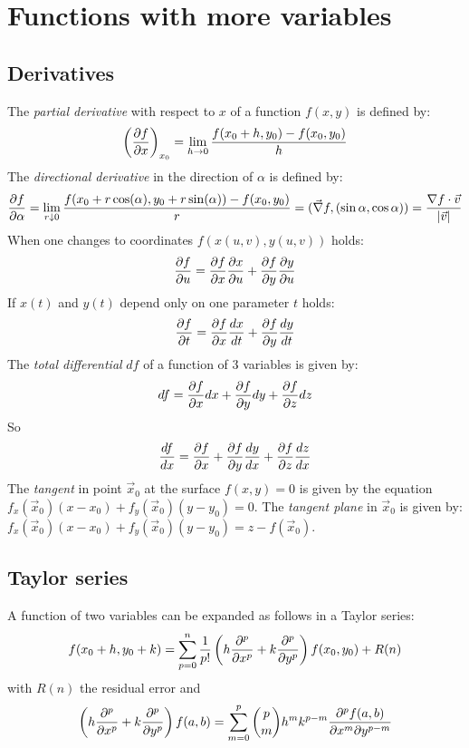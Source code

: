 \documentclass[a4paper,fancyheadings,twoside]{report}
\begin{document}
\section{Functions with more variables}
\subsection{Derivatives}
The {\it partial derivative} with respect to $x$ of a function $f(x,y)$ is defined by:
\[
\left(\frac{\partial f}{\partial x}\right)_{x_0}=\lim_{h\rightarrow0}\frac{f(x_0+h,y_0)-f(x_0,y_0)}{h}
\]
The {\it directional derivative} in the direction of $\alpha$ is defined by:
\[
\frac{\partial f}{\partial \alpha}=\lim_{r\downarrow0}\frac{f(x_0+r\cos(\alpha),y_0+r\sin(\alpha))-f(x_0,y_0)}{r}=
(\vec{\nabla}f,(\sin\alpha,\cos\alpha))=\frac{\nabla f\cdot\vec{v}}{|\vec{v}|}
\]
When one changes to coordinates $f(x(u,v),y(u,v))$ holds:
\[
\frac{\partial f}{\partial u}=\frac{\partial f}{\partial x}\frac{\partial x}{\partial u}+\frac{\partial f}{\partial y}\frac{\partial y}{\partial u}
\]
If $x(t)$ and $y(t)$ depend only on one parameter $t$ holds:
\[
\frac{\partial f}{\partial t}=\frac{\partial f}{\partial x}\frac{dx}{dt}+\frac{\partial f}{\partial y}\frac{dy}{dt}
\]
The {\it total differential} $df$ of a function of 3 variables is given by:
\[
df=\frac{\partial f}{\partial x}dx+\frac{\partial f}{\partial y}dy+\frac{\partial f}{\partial z}dz
\]
So
\[
\frac{df}{dx}=\frac{\partial f}{\partial x}+\frac{\partial f}{\partial y}\frac{dy}{dx}+\frac{\partial f}{\partial z}\frac{dz}{dx}
\]
The {\it tangent} in point $\vec{x}_0$ at the surface $f(x,y)=0$ is given by
the equation $f_x(\vec{x}_0)(x-x_0)+f_y(\vec{x}_0)(y-y_0)=0$.
\npar
The {\it tangent plane} in $\vec{x}_0$ is given by:
$f_x(\vec{x}_0)(x-x_0)+f_y(\vec{x}_0)(y-y_0)=z-f(\vec{x}_0)$.

\subsection{Taylor series}
A function of two variables can be expanded as follows in a Taylor series:
\[
f(x_0+h,y_0+k)=\sum\limits_{p=0}^n \frac{1}{p!}
\left(h\frac{\partial ^p}{\partial x^p}+k\frac{\partial ^p}{\partial y^p}\right)f(x_0,y_0)+R(n)
\]
with $R(n)$ the residual error and
\[
\left(h\frac{\partial ^p}{\partial x^p}+k\frac{\partial ^p}{\partial y^p}\right)f(a,b)=\sum\limits_{m=0}^p{p\choose m}
h^mk^{p-m}\frac{\partial^pf(a,b)}{\partial x^m\partial y^{p-m}}
\]
\end{document}

